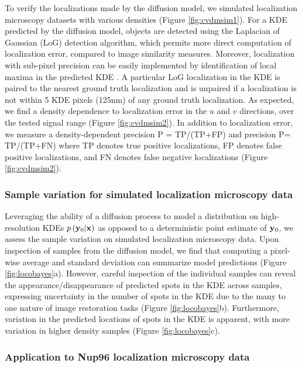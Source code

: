To verify the localizations made by the diffusion model, we simulated localization microscopy datasets with various densities (Figure \ref{fig:cvdmsim1}). For a KDE predicted by the diffusion model, objects are detected using the Laplacian of Gaussian (LoG) detection algorithm, which permits more direct computation of localization error, compared to image similarity measures. Moreover, localization with sub-pixel precision can be easily implemented by identification of local maxima in the predicted KDE \parencite{Nehme2020}. A particular LoG localization in the KDE is paired to the nearest ground truth localization and is unpaired if a localization is not within 5 KDE pixels (125nm) of any ground truth localization. As expected, we find a density dependence to localization error in the $u$ and $v$ directions, over the tested signal range (Figure \ref{fig:cvdmsim2}). In addition to localization error, we measure a density-dependent precision P = TP/(TP+FP) and precision P= TP/(TP+FN) where TP denotes true positive localizations, FP denotes false positive localizations, and FN denotes false negative localizations (Figure \ref{fig:cvdmsim2}). 

\subsubsection{Sample variation for simulated localization microscopy data}

Leveraging the ability of a diffusion process to model a distribution on high-resolution KDEs $p\left(\bold{y}_0\lvert \bold{x}\right)$ as opposed to a deterministic point estimate of $\bold{y}_0$, we assess the sample variation on simulated localization microscopy data. Upon inspection of samples from the diffusion model, we find that computing a pixel-wise average and standard deviation can summarize model predictions (Figure \ref{fig:locobayes}a). However, careful inspection of the individual samples can reveal the appearance/disappearance of predicted spots in the KDE across samples, expressing uncertainty in the number of spots in the KDE due to the many to one nature of image restoration tasks (Figure \ref{fig:locobayes}b). Furthermore, variation in the predicted locations of spots in the KDE is apparent, with more variation in higher density samples (Figure \ref{fig:locobayes}c). 

\subsubsection{Application to Nup96 localization microscopy data}

